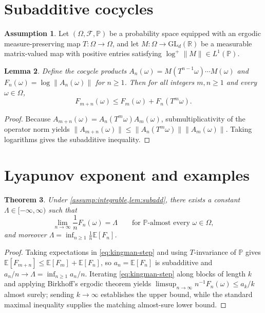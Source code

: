 \documentclass{article}
\newtheorem{theorem}{Theorem}[section]
\newtheorem{lemma}[theorem]{Lemma}
\theoremstyle{definition}
\newtheorem{assumption}[theorem]{Assumption}
\theoremstyle{remark}
\begin{document}
\section{Subadditive cocycles}
\label{sec:cocycles}

\begin{assumption}
\label{assump:integrable}
Let $(\Omega, \mathcal{F}, \mathbb{P})$ be a probability space equipped with an
ergodic measure-preserving map $T : \Omega \to \Omega$, and let
$M : \Omega \to \mathrm{GL}_d(\mathbb{R})$ be a measurable matrix-valued map
with positive entries satisfying $\log^+ \|M\| \in L^1(\mathbb{P})$.
\end{assumption}

\begin{lemma}
\label{lem:subadd}
Define the cocycle products $A_n(\omega) = M(T^{n-1}\omega) \cdots M(\omega)$
and $F_n(\omega) = \log \|A_n(\omega)\|$ for $n \ge 1$. Then for all integers
$m, n \ge 1$ and every $\omega \in \Omega$,
\begin{equation}
\label{eq:kingman-step}
F_{m+n}(\omega) \le F_m(\omega) + F_n(T^m \omega).
\end{equation}
\end{lemma}
\begin{proof}
Because $A_{m+n}(\omega) = A_n(T^m \omega) A_m(\omega)$, submultiplicativity
of the operator norm yields
$\|A_{m+n}(\omega)\| \le \|A_n(T^m \omega)\| \|A_m(\omega)\|$. Taking
logarithms gives the subadditive inequality.
\end{proof}


\section{Lyapunov exponent and examples}
\label{sec:lyapunov}

\begin{theorem}
\label{thm:lyapunov}
Under \cref{assump:integrable,lem:subadd}, there exists a constant
$\Lambda \in [-\infty, \infty)$ such that
\[
\lim_{n \to \infty} \frac{1}{n} F_n(\omega) = \Lambda
\qquad \text{for } \mathbb{P}\text{-almost every } \omega \in \Omega,
\]
and moreover $\Lambda = \inf_{n \ge 1} \frac{1}{n} \mathbb{E}[F_n]$.
\end{theorem}
\begin{proof}
Taking expectations in \eqref{eq:kingman-step} and using $T$-invariance of
$\mathbb{P}$ gives $\mathbb{E}[F_{m+n}] \le \mathbb{E}[F_m] + \mathbb{E}[F_n]$,
so $a_n = \mathbb{E}[F_n]$ is subadditive and $a_n / n \to \Lambda = \inf_{n \ge 1} a_n / n$.
Iterating \eqref{eq:kingman-step} along blocks of length $k$ and applying
Birkhoff's ergodic theorem yields $\limsup_{n \to \infty} n^{-1} F_n(\omega) \le a_k / k$
almost surely; sending $k \to \infty$ establishes the upper bound, while the
standard maximal inequality supplies the matching almost-sure lower bound.
\end{proof}
\end{document}
